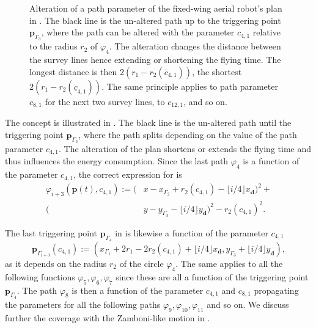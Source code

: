\begin{sidewaysfigure}
  \rotatesidewayslabel
  \centering
  
  \vspace*{30pt}
  \caption[Alteration of a path parameter with the Zamboni-like motion]{Alteration of a path parameter of the fixed-wing aerial robot's plan in . The black line is the un-altered path up to the triggering point $\mathbf{p}_{\Gamma_3}$, where the path can be altered with the parameter $c_{4,1}$ relative to the radius $r_2$ of $\varphi_4$. The alteration changes the distance between the survey lines hence extending or shortening the flying time. The longest distance is then $2(r_1-r_2(\overline{c}_{4,1}))$, the shortest $2(r_1-r_2(\underline{c}_{4,1}))$. The same principle applies to path parameter $c_{8,1}$ for the next two survey lines, to $c_{12,1}$, and so on.}
  \label{fig:zambo-repla_pb}
\end{sidewaysfigure}

The concept is illustrated in . The black line is the un-altered path until the triggering point $\mathbf{p}_{\Gamma_3}$, where the path splits depending on the value of the path parameter $c_{4,1}$. The alteration of the plan shortens or extends the flying time and thus influences the energy consumption. Since the last path $\varphi_4$ is a function of the parameter $c_{4,1}$, the correct expression for  is 
\begin{equation}\label{eq:line-gene-param}\begin{split}
  \varphi_{i+3}(\mathbf{p}(t),c_{4,1}):=(&x-x_{\Gamma_2}+r_2(c_{4,1})-\lfloor i/4\rfloor x_\mathbf{d})^2+\\
  (&y-y_{\Gamma_3}-\lfloor i/4\rfloor y_\mathbf{d})^2-r_2(c_{4,1})^2.
\end{split}\end{equation}

The last triggering point $\mathbf{p}_{\Gamma_4}$ in  is likewise a function of the parameter $c_{4,1}$
\begin{equation}
  \mathbf{p}_{\Gamma_{i+3}}(c_{4,1}):=(x_{\Gamma_1}+2r_1-2r_2(c_{4,1})+\lfloor i/4\rfloor x_\mathbf{d},y_{\Gamma_3}+\lfloor i/4\rfloor y_\mathbf{d}),
\end{equation}
as it depends on the radius $r_2$ of the circle $\varphi_4$. The same applies to all the following functions $\varphi_5,\varphi_6,\varphi_7$ since these are all a function of the triggering point $\mathbf{p}_{\Gamma_4}$. The path $\varphi_8$ is then a function of the parameter $c_{4,1}$ and $c_{8,1}$ propagating the parameters for all the following paths $\varphi_9,\varphi_{10},\varphi_{11}$ and so on.
We discuss further the coverage with the Zamboni-like motion in .

